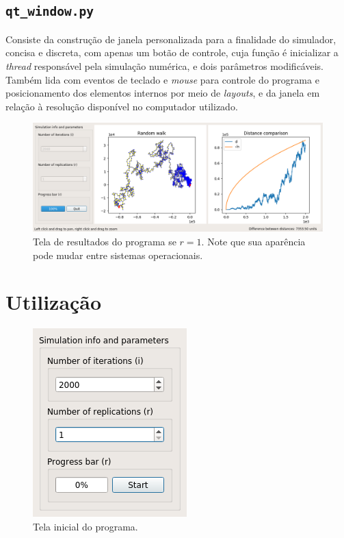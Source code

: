 \documentclass{sftex/sftex}
\begin{document}
\subsection{\texttt{qt\_window.py}}

Consiste da construção de janela personalizada para a finalidade do simulador,
concisa e discreta, com apenas um botão de controle, cuja função é inicializar
a \emph{thread} responsável pela simulação numérica, e dois parâmetros
modificáveis. Também lida com eventos de teclado e \emph{mouse} para controle
do programa e posicionamento dos elementos internos por meio de \emph{layouts},
e da janela em relação à resolução disponível no computador utilizado.

\begin{figure}[htbp]
    \centering
    \includegraphics[scale=0.4]{example_run.png}
    \caption{Tela de resultados do programa se $r = 1$. Note que sua aparência
    pode mudar entre sistemas operacionais.}
\end{figure}

\section{Utilização}

\begin{figure}
    \centering
    \includegraphics[scale=0.65]{program.png}
    \caption{Tela inicial do programa.}
\end{figure}
\end{document}
